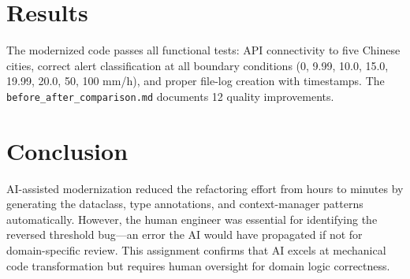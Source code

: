 \documentclass[12pt,a4paper]{article}
\begin{document}
\section{Results}
The modernized code passes all functional tests: API connectivity to five Chinese cities, correct alert classification at all boundary conditions (0, 9.99, 10.0, 15.0, 19.99, 20.0, 50, 100 mm/h), and proper file-log creation with timestamps. The \texttt{before\_after\_comparison.md} documents 12 quality improvements.

\section{Conclusion}
AI-assisted modernization reduced the refactoring effort from hours to minutes by generating the dataclass, type annotations, and context-manager patterns automatically. However, the human engineer was essential for identifying the reversed threshold bug—an error the AI would have propagated if not for domain-specific review. This assignment confirms that AI excels at mechanical code transformation but requires human oversight for domain logic correctness.
\end{document}

